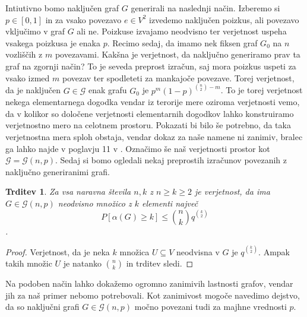 \documentclass[12pt,a4paper,twoside]{article}
\theoremstyle{definition} %
\theoremstyle{plain} %
\newtheorem{trditev}[definicija]{Trditev}
\numberwithin{equation}{section}  %
\begin{document}
Intiutivno bomo naključen graf $G$ generirali na naslednji način. Izberemo si $p \in [0, 1]$ in za vsako povezavo $e \in V^2$ izvedemo naključen poizkus, ali povezavo vključimo v graf $G$ ali ne. Poizkuse izvajamo neodvisno ter verjetnost uspeha vsakega poizkusa je enaka $p$. Recimo sedaj, da imamo nek fiksen graf $G_0$ na $n$ vozliščih z $m$ povezavami. Kakšna je verjetnost, da naključno generiramo prav ta graf na zgornji način? To je seveda preprost izračun, saj mora poizkus uspeti za vsako izmed $m$ povezav ter spodleteti za mankajoče povezave. Torej verjetnost, da je naključen $G \in \mathcal{G}$ enak grafu $G_0$ je  $p^m (1-p)^{{n \choose 2} - m}$. To je torej verjetnost nekega elementarnega dogodka vendar iz terorije mere oziroma verjetnosti vemo, da v kolikor so določene verjetnosti elementarnih dogodkov lahko konstruiramo verjetnostno mero na celotnem prostoru. Pokazati bi bilo še potrebno, da taka verjetnostna mera sploh obstaja, vendar dokaz za naše namene ni zanimiv, bralec ga lahko najde v poglavju 11 v \cite{maingraph}. Označimo še naš verjetnosti prostor kot $\mathcal{G} = \mathcal{G}(n, p)$. Sedaj si bomo ogledali nekaj preprostih izračunov povezanih z naključno generiranimi grafi.

\begin{trditev}
\label{indeprand}
Za vsa naravna števila $n,k$ z $n \ge k \ge 2$ je verjetnost, da ima $G \in \mathcal{G}(n,p)$ neodvisno množico z $k$ elementi največ
$$ P[\alpha(G) \ge k] \le {n \choose k} q ^{k \choose 2} $$.
\end{trditev}

\begin{proof}
Verjetnost, da je neka $k$ množica $U \subseteq V$ neodvisna v $G$ je $q^{k \choose 2}$. Ampak takih množic $U$ je natanko ${n \choose k}$ in trditev sledi.
\end{proof}

Na podoben način lahko dokažemo ogromno zanimivih lastnosti grafov, vendar jih za naš primer nebomo potrebovali. Kot zanimivost mogoče navedimo dejstvo, da so naključni grafi $G \in \mathcal{G}(n, p)$ močno povezani tudi za majhne vrednosti $p$.
\end{document}
